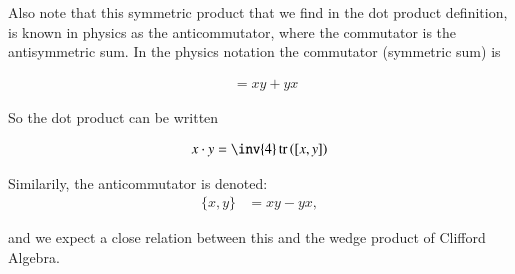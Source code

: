 \documentclass{article}
\DeclareMathOperator{\tr}{tr}
\newcommand{\trace}[1]{\tr\left({#1}\right)}
\begin{document}
Also note that this symmetric product that we find in the dot product definition, is known in physics as the anticommutator, where the commutator
is the antisymmetric sum.  In the physics notation the commutator (symmetric sum) is

\begin{align}
[x, y] &= x y + y x
\end{align}

So the dot product can be written

\begin{align}
x \cdot y = \inv{4}\trace{[x, y]}
\end{align}

Similarily, the anticommutator is denoted:
\begin{align}
\{x, y\} &= x y - y x,
\end{align}

and we expect a close relation between this and the wedge product of Clifford Algebra.



\end{document}
